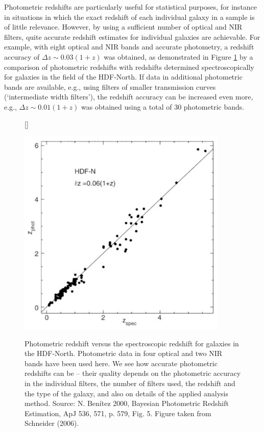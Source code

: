 \documentclass[a4paper,11pt]{article}
\begin{document}
{\noindent}Photometric redshifts are particularly useful for statistical purposes, for instance in situations in which the exact redshift of each individual galaxy in a sample is of little relevance. However, by using a sufficient number of optical and NIR filters, quite accurate redshift estimates for individual galaxies are achievable. For example, with eight optical and NIR bands and accurate photometry, a redshift accuracy of  $\Delta z\sim0.03(1+z)$ was obtained, as demonstrated in Figure \ref{fig:photvsspecredshift} by a comparison of photometric redshifts with redshifts determined spectroscopically for galaxies in the field of the HDF-North. If data in additional photometric bands are available, e.g., using filters of smaller transmission curves (`intermediate width filters'), the redshift accuracy can be increased even more, e.g., $\Delta z\sim0.01(1+z)$ was obtained using a total of 30 photometric bands.

\begin{figure}[t]
    [\FBwidth]
    {\caption{\footnotesize{Photometric redshift versus the spectroscopic redshift for galaxies in the HDF-North. Photometric data in four optical and two NIR bands have been used here. We see how accurate photometric redshifts can be -- their quality depends on the photometric accuracy in the individual filters, the number of filters used, the redshift and the type of the galaxy, and also on details of the applied analysis method. Source: N. Benítez 2000, Bayesian Photometric Redshift Estimation, ApJ 536, 571, p. 579, Fig. 5. Figure taken from Schneider (2006).}}
    \label{fig:photvsspecredshift}}
    {\includegraphics[width=10cm]{figures/PhotVsSpecRedshift.png}}
\end{figure}
\end{document}
